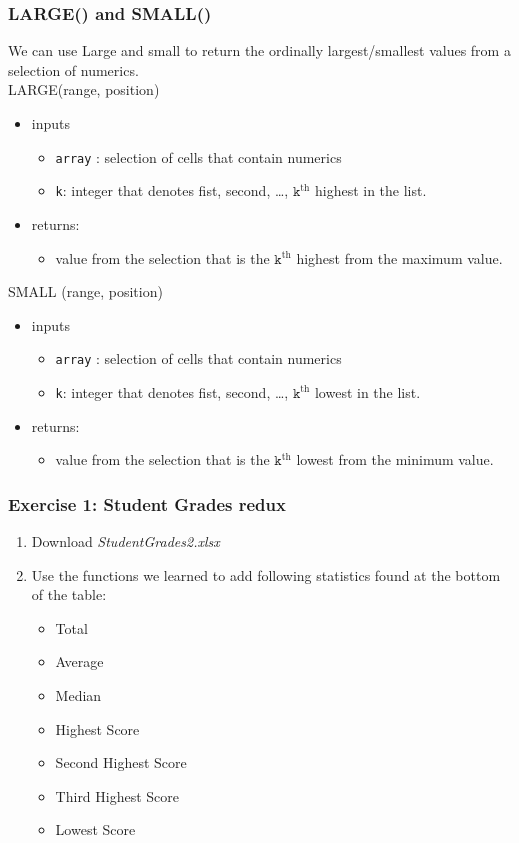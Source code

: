 \documentclass[12pt]{beamer}
\begin{document}
	\begin{frame}
		\frametitle{LARGE() and SMALL()}
		We can use Large and small to return the ordinally largest/smallest values from a selection of numerics. \\
		LARGE(range, position)
		\begin{itemize}
			\item inputs
			\begin{itemize}
				\item \texttt{array} : selection of cells that contain numerics
				\item \texttt{k}: integer that denotes fist, second, \ldots, $\texttt{k}^{\text{th}}$ highest in the list.
			\end{itemize}
			\item returns:
				\begin{itemize}
					\item value from the selection that is the $\texttt{k}^{\text{th}}$ highest from the maximum value. 
				\end{itemize}
		\end{itemize}
		SMALL (range, position)
			\begin{itemize}
				\item inputs
				\begin{itemize}
					\item \texttt{array} : selection of cells that contain numerics
					\item \texttt{k}: integer that denotes fist, second, \ldots, $\texttt{k}^{\text{th}}$ lowest in the list.
				\end{itemize}
				\item returns:
				\begin{itemize}
					\item value from the selection that is the $\texttt{k}^{\text{th}}$ lowest from the minimum value. 
				\end{itemize}
			\end{itemize}	
	\end{frame}
\begin{frame}
	\frametitle{Exercise 1: Student Grades redux}
	\begin{enumerate}
		\item Download \textit{StudentGrades2.xlsx}
		\item Use the functions we learned to add following statistics found at the bottom of the table:
		\begin{itemize}
			\item Total
			\item Average
			\item Median
			\item Highest Score
			\item Second Highest Score
			\item Third Highest Score 
			\item Lowest Score
		\end{itemize}
	\end{enumerate} 
	\end{frame}
\end{document}
